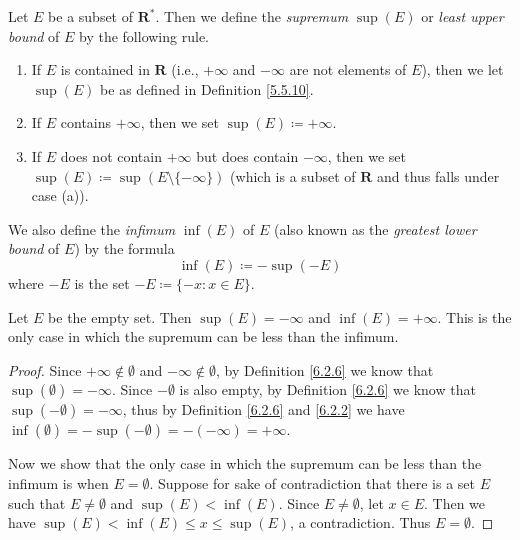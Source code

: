 \begin{definition}\label{6.2.6}
      Let \(E\) be a subset of \(\mathbf{R}^*\).
      Then we define the \emph{supremum} \(\sup(E)\) or \emph{least upper bound} of \(E\) by the following rule.
      \begin{enumerate}
            \item If \(E\) is contained in \(\mathbf{R}\) (i.e., \(+\infty\) and \(-\infty\) are not elements of \(E\)), then we let \(\sup(E)\) be as defined in Definition \ref{5.5.10}.
            \item If \(E\) contains \(+\infty\), then we set \(\sup(E) \coloneqq +\infty\).
            \item If \(E\) does not contain \(+\infty\) but does contain \(-\infty\), then we set \(\sup(E) \coloneqq \sup(E \setminus \{-\infty\})\)
                  (which is a subset of \(\mathbf{R}\) and thus falls under case (a)).
      \end{enumerate}
      We also define the \emph{infimum} \(\inf(E)\) of \(E\) (also known as the \emph{greatest lower bound} of \(E\)) by the formula
      \[
            \inf(E) \coloneqq -\sup(-E)
      \]
      where \(-E\) is the set \(-E \coloneqq \{-x : x \in E\}\).
\end{definition}

\setcounter{theorem}{9}
\begin{example}\label{6.2.10}
      Let \(E\) be the empty set.
      Then \(\sup(E) = -\infty\) and \(\inf(E) = +\infty\).
      This is the only case in which the supremum can be less than the infimum.
\end{example}

\begin{proof}
      Since \(+\infty \notin \emptyset\) and \(-\infty \notin \emptyset\), by Definition \ref{6.2.6} we know that \(\sup(\emptyset) = -\infty\).
      Since \(-\emptyset\) is also empty, by Definition \ref{6.2.6} we know that \(\sup(-\emptyset) = -\infty\), thus by Definition \ref{6.2.6} and \ref{6.2.2} we have \(\inf(\emptyset) = -\sup(-\emptyset) = -(-\infty) = +\infty\).

      Now we show that the only case in which the supremum can be less than the infimum is when \(E = \emptyset\).
      Suppose for sake of contradiction that there is a set \(E\) such that \(E \neq \emptyset\) and \(\sup(E) < \inf(E)\).
      Since \(E \neq \emptyset\), let \(x \in E\).
      Then we have \(\sup(E) < \inf(E) \leq x \leq \sup(E)\), a contradiction.
      Thus \(E = \emptyset\).
\end{proof}


